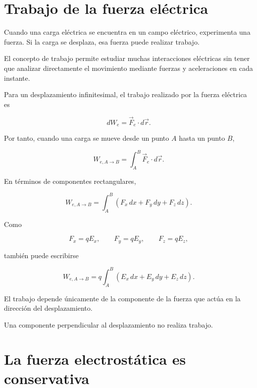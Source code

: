 \section{Trabajo de la fuerza eléctrica}

Cuando una carga eléctrica se encuentra en un campo eléctrico, experimenta una
fuerza. Si la carga se desplaza, esa fuerza puede realizar trabajo.

El concepto de trabajo permite estudiar muchas interacciones eléctricas sin tener
que analizar directamente el movimiento mediante fuerzas y aceleraciones en cada
instante.

Para un desplazamiento infinitesimal, el trabajo realizado por la fuerza eléctrica es

\[
dW_e=\vec F_e\cdot d\vec r.
\]

Por tanto, cuando una carga se mueve desde un punto \(A\) hasta un punto \(B\),

\begin{equation}
\boxed{
W_{e,A\to B}
=
\int_A^B \vec F_e\cdot d\vec r
}.
\label{eq:trabajo_fuerza_electrica}
\end{equation}

En términos de componentes rectangulares,

\begin{equation}
\boxed{
W_{e,A\to B}
=
\int_A^B
\left(
F_x\,dx+F_y\,dy+F_z\,dz
\right)
}.
\label{eq:trabajo_electrico_componentes}
\end{equation}

Como

\[
F_x=qE_x,\qquad
F_y=qE_y,\qquad
F_z=qE_z,
\]

también puede escribirse

\begin{equation}
\boxed{
W_{e,A\to B}
=
q\int_A^B
\left(
E_x\,dx+E_y\,dy+E_z\,dz
\right)
}.
\label{eq:trabajo_campo_componentes}
\end{equation}

\begin{idea}

El trabajo depende únicamente de la componente de la fuerza que actúa en la
dirección del desplazamiento.

Una componente perpendicular al desplazamiento no realiza trabajo.

\end{idea}


\section{La fuerza electrostática es conservativa}

